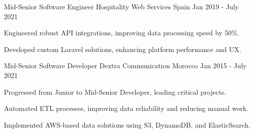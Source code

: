 \begin{cventries}
\cventry
{Mid-Senior Software Engineer} %
{Hospitality Web Services} %
{Spain} %
{Jan 2019 - July 2021} %
{
  \begin{cvitems} %
    \item {Engineered robust API integrations, improving data processing speed by 50\%.}
    \item {Developed custom Laravel solutions, enhancing platform performance and UX.}
  \end{cvitems}
}

\cventry
{Mid-Senior Software Developer} %
{Dextra Communication} %
{Morocco} %
{Jan 2015 - July 2021} %
{
  \begin{cvitems} %
    \item {Progressed from Junior to Mid-Senior Developer, leading critical projects.}
    \item {Automated ETL processes, improving data reliability and reducing manual work.}
    \item {Implemented AWS-based data solutions using S3, DynamoDB, and ElasticSearch.}
  \end{cvitems}
}

\end{cventries}
